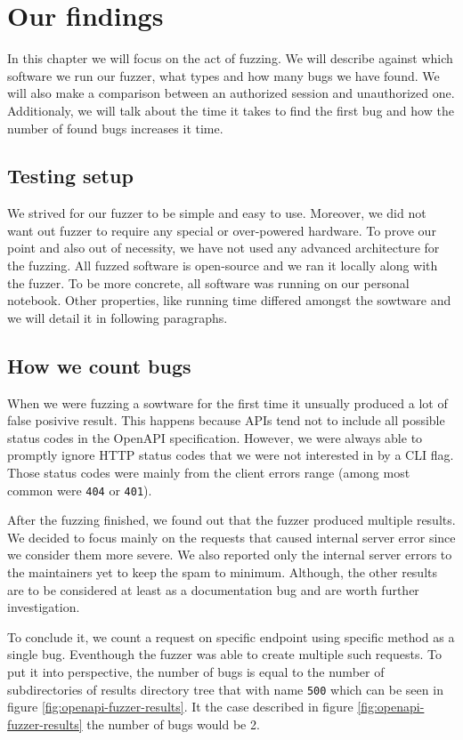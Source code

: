 \chapter{Our findings}
In this chapter we will focus on the act of fuzzing. We will describe against which software we run our fuzzer, what types and how many bugs we have found. We will also make a comparison between an authorized session and unauthorized one. Additionaly, we will talk about the time it takes to find the first bug and how the number of found bugs increases it time.

\section{Testing setup}
We strived for our fuzzer to be simple and easy to use. Moreover, we did not want out fuzzer to require any special or over-powered hardware. To prove our point and also out of necessity, we have not used any advanced architecture for the fuzzing. All fuzzed software is open-source and we ran it locally along with the fuzzer. To be more concrete, all software was running on our personal notebook. Other properties, like running time differed amongst the sowtware and we will detail it in following paragraphs.

\section{How we count bugs}
When we were fuzzing a sowtware for the first time it unsually produced a lot of false posivive result. This happens because APIs tend not to include all possible status codes in the OpenAPI specification. However, we were always able to promptly ignore HTTP status codes that we were not interested in by a CLI flag. Those status codes were mainly from the client errors range (among most common were \texttt{404} or \texttt{401}).

After the fuzzing finished, we found out that the fuzzer produced multiple results. We decided to focus mainly on the requests that caused internal server error since we consider them more severe. We also reported only the internal server errors to the maintainers yet to keep the spam to minimum. Although, the other results are to be considered at least as a documentation bug and are worth further investigation.

To conclude it, we count a request on specific endpoint using specific method as a single bug. Eventhough the fuzzer was able to create multiple such requests. To put it into perspective, the number of bugs is equal to the number of subdirectories of results directory tree that with name \texttt{500} which can be seen in figure \ref{fig:openapi-fuzzer-results}. It the case described in figure \ref{fig:openapi-fuzzer-results} the number of bugs would be 2.


